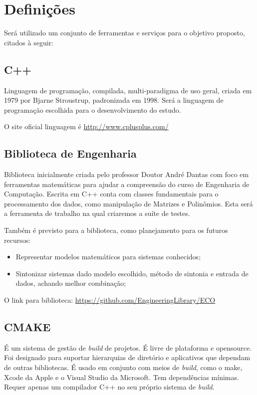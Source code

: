 \documentclass[
	article,			%
	12pt,				%
	oneside,			%
	a4paper,			%
	english,			
	brazil,
	sumario=tradicional
	]{abntex2}
\begin{document}
\pagebreak
\section{Definições}

Será utilizado um conjunto de ferramentas e serviços para o objetivo proposto, citados à seguir:

\subsection{C++}

Linguagem de programação, compilada, multi-paradigma de uso geral, criada em 1979 por Bjarne Stroustrup, padronizada em 1998. Será a linguagem de programação escolhida para o desenvolvimento do estudo.

O site oficial linguagem é \href{http://www.cplusplus.com/}{http://www.cplusplus.com/}

\nocite{cplusplus.com}

\pagebreak
\subsection{Biblioteca de Engenharia}

Biblioteca inicialmente criada pelo professor Doutor André Dantas com foco em ferramentas matemáticas para ajudar a compreensão do curso de Engenharia de Computação. Escrita em C++ conta com classes fundamentais para o processamento dos dados, como manipulação de Matrizes e Polinômios. Esta será a ferramenta de trabalho na qual criaremos a suíte de testes.

Também é previsto para a biblioteca, como planejamento para os futuros recursos:

\begin{itemize}
	\item Representar modelos matemáticos para sistemas conhecidos;
	\item Sintonizar sistemas dado modelo escolhido, método de sintonia e entrada de dados, achando melhor combinação;
\end{itemize}

O link para biblioteca: \href{https://github.com/EngineeringLibrary/ECO}{https://github.com/EngineeringLibrary/ECO}

\pagebreak
\subsection{CMAKE}
É um sistema de gestão de \textit{build} de projetos. É livre de plataforma e opensource. Foi designado para suportar hierarquias de diretório e aplicativos que dependam de outras bibliotecas. É usado em conjunto com meios de \textit{build}, como o make, Xcode da Apple e o Visual Studio da Microsoft. Tem dependências mínimas. Requer apenas um compilador C++ no seu próprio sistema de \textit{build}.
\end{document}

